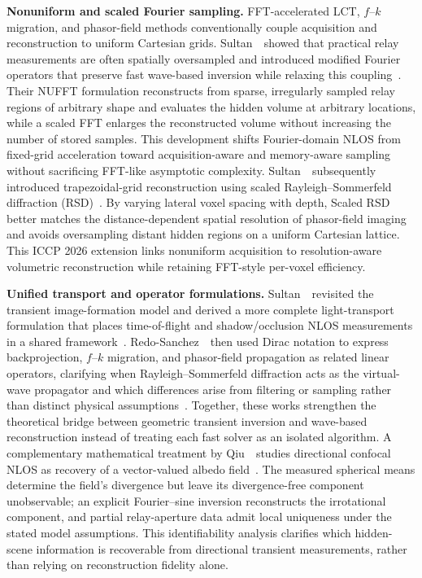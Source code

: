 \vspace{0.8mm}
\noindent \textbf{Nonuniform and scaled Fourier sampling.}
FFT-accelerated LCT, $f$--$k$ migration, and phasor-field methods conventionally couple acquisition and reconstruction to uniform Cartesian grids. Sultan~\etal~showed that practical relay measurements are often spatially oversampled and introduced modified Fourier operators that preserve fast wave-based inversion while relaxing this coupling~\cite{sultanOptimizedSamplingNLOS2025}. Their NUFFT formulation reconstructs from sparse, irregularly sampled relay regions of arbitrary shape and evaluates the hidden volume at arbitrary locations, while a scaled FFT enlarges the reconstructed volume without increasing the number of stored samples. This development shifts Fourier-domain NLOS from fixed-grid acceleration toward acquisition-aware and memory-aware sampling without sacrificing FFT-like asymptotic complexity.
Sultan~\etal~subsequently introduced trapezoidal-grid reconstruction using scaled Rayleigh--Sommerfeld diffraction (RSD)~\cite{sultan2026trapezoidal}. By varying lateral voxel spacing with depth, Scaled RSD better matches the distance-dependent spatial resolution of phasor-field imaging and avoids oversampling distant hidden regions on a uniform Cartesian lattice. This ICCP 2026 extension links nonuniform acquisition to resolution-aware volumetric reconstruction while retaining FFT-style per-voxel efficiency.


\vspace{0.8mm}
\noindent \textbf{Unified transport and operator formulations.}
Sultan~\etal~revisited the transient image-formation model and derived a more complete light-transport formulation that places time-of-flight and shadow/occlusion NLOS measurements in a shared framework~\cite{sultanAccurateTransportModel2024}. Redo-Sanchez~\etal~then used Dirac notation to express backprojection, $f$--$k$ migration, and phasor-field propagation as related linear operators, clarifying when Rayleigh--Sommerfeld diffraction acts as the virtual-wave propagator and which differences arise from filtering or sampling rather than distinct physical assumptions~\cite{redoSanchezCohesiveDiracNLOS2024}. Together, these works strengthen the theoretical bridge between geometric transient inversion and wave-based reconstruction instead of treating each fast solver as an isolated algorithm.
A complementary mathematical treatment by Qiu~\etal~studies directional confocal NLOS as recovery of a vector-valued albedo field~\cite{qiu2026directional}. The measured spherical means determine the field's divergence but leave its divergence-free component unobservable; an explicit Fourier--sine inversion reconstructs the irrotational component, and partial relay-aperture data admit local uniqueness under the stated model assumptions. This identifiability analysis clarifies which hidden-scene information is recoverable from directional transient measurements, rather than relying on reconstruction fidelity alone.

